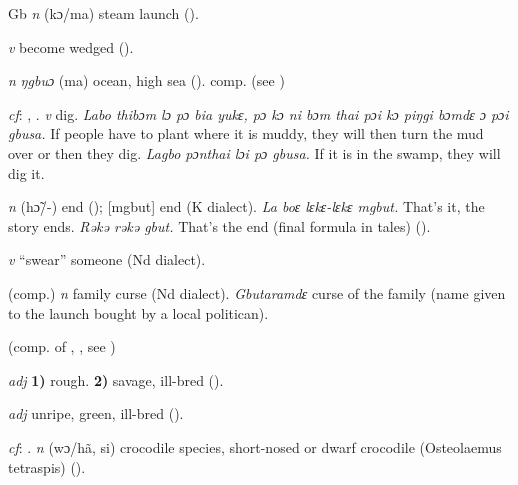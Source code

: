 \begin{letter}{Gb}
 \textit{n} (kɔ/ma) steam launch (\citealt{Pichl1967}).

 \textit{v} become wedged (\citealt{Pichl1967}).

 \textit{n} \textit{ŋgbuɔ} (ma) ocean, high sea (\citealt{Pichl1967}). comp.  (see ) 

 \textit{cf}: , . \textit{v} dig. \textit{Labo thibɔm lɔ pɔ bia yukɛ, pɔ kɔ ni bɔm thai pɔi kɔ piŋgi bɔmdɛ ɔ pɔi gbusa.} If people have to plant where it is muddy, they will then turn the mud over or then they dig. \textit{Lagbo pɔnthai lɔi pɔ gbusa.} If it is in the swamp, they will dig it.

 \textit{n} (hɔ̃/-) end (\citealt{Pichl1967}); [mgbut] end (K dialect). \textit{La boɛ lɛkɛ-lɛkɛ mgbut.} That's it, the story ends. \textit{Rəkə rəkə gbut.} That's the end (final formula in tales) (\citealt{Pichl1967}).

 \textit{v} “swear” someone (Nd dialect). 

 (comp.) \textit{n} family curse (Nd dialect). \textit{Gbutaramdɛ} curse of the family (name given to the launch bought by a local politican). 

 (comp. of , , see ) 

 \textit{adj} \textbf{1)} rough. \textbf{2)} savage, ill-bred (\citealt{Pichl1967}).

 \textit{adj} unripe, green, ill-bred (\citealt{Pichl1967}).

 \textit{cf}: . \textit{n} (wɔ/hã, si) crocodile species, short-nosed or dwarf crocodile (Osteolaemus tetraspis) (\citealt{Pichl1967}). 

\end{letter}
